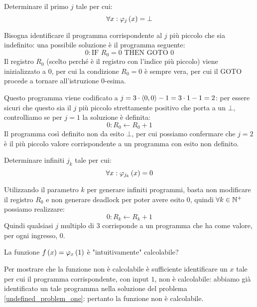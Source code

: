 \documentclass{lectures}
\begin{document}
\begin{multicols}{2}
    \begin{problem}
        \label{undefined_problem_one}
        Determinare il primo \(j\) tale per cui: \[\forall x: \varphi_j\left(x\right) = \bot\]
    \end{problem}
    \begin{solution}
        Bisogna identificare il programma corrispondente al \(j\) più piccolo che sia indefinito: una possibile soluzione è il programma seguente:
        \[
            0: \text{IF }R_0 = 0\text{ THEN GOTO }0
        \]
        Il registro \(R_0\) (scelto perché è il registro con l'indice più piccolo) viene inizializzato a \(0\), per cui la condizione \(R_0 = 0\) è sempre vera, per cui il GOTO procede a tornare all'istruzione \(0\)-esima.
            
        Questo programma viene codificato a \(j=3\cdot\left\langle0,0\right\rangle-1=3\cdot 1-1=2\): per essere sicuri che questo sia il \(j\) più piccolo strettamente positivo che porta a un \(\bot\), controlliamo se per \(j=1\) la soluzione è definita:
        \[
            0: R_0 \leftarrow R_0 +1
        \]
        Il programma così definito non da esito \(\bot\), per cui possiamo confermare che \(j=2\) è il più piccolo valore corrispondente a un programma con esito non definito.
    \end{solution}
    \begin{problem}
        \label{infinite_zero_problem}
        Determinare infiniti \(j_k\) tale per cui: \[\forall x: \varphi_{j_k}\left(x\right) = 0\]
    \end{problem}
    \begin{solution}
        Utilizzando il parametro \(k\) per generare infiniti programmi, basta non modificare il registro \(R_0\) e non generare deadlock per poter avere esito \(0\), quindi \(\forall k \in \mathbb{N}^{+}\) possiamo realizzare:
        \[
            0: R_k \leftarrow R_k + 1
        \]
        Quindi qualsiasi \(j\) multiplo di \(3\) corrisponde a un programma che ha come valore, per ogni ingresso, \(0\).
    \end{solution}
    \begin{problem}
        \label{intuitive_calculable_function}
        La funzione \(f\left(x\right) = \varphi_x\left(1\right)\) è "intuitivamente" calcolabile?
    \end{problem}
    \begin{solution}
        Per mostrare che la funzione non è calcolabile è sufficiente identificare un \(x\) tale per cui il programma corrispondente, con input \(1\), non è calcolabile: abbiamo già identificato un tale programma nella soluzione del problema \ref{undefined_problem_one}: pertanto la funzione non è calcolabile.
    \end{solution}
\end{multicols}
\clearpage
\end{document}
